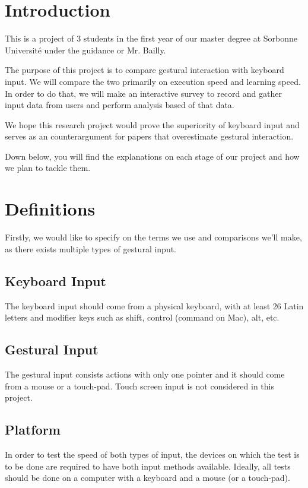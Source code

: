 \documentclass[12pt]{article}
\begin{document}
\section{Introduction}
This is a project of 3 students in the first year of our master degree at Sorbonne Université under the guidance or Mr. Bailly.

The purpose of this project is to compare gestural interaction with keyboard input. We will compare the two primarily on execution speed and learning speed. In order to do that, we will make an interactive survey to record and gather input data from users and perform analysis based of that data. 

We hope this research project would prove the superiority of keyboard input and serves as an counterargument for papers that overestimate gestural interaction.

Down below, you will find the explanations on each stage of our project and how we plan to tackle them.

\section{Definitions}
Firstly, we would like to specify on the terms we use and comparisons we'll make, as there exists multiple types of gestural input. 

\subsection{Keyboard Input}
The keyboard input should come from a physical keyboard, with at least 26 Latin letters and modifier keys such as shift, control (command on Mac), alt, etc.

\subsection{Gestural Input}
The gestural input consists actions with only one pointer and it should come from a mouse or a touch-pad. Touch screen input is not considered in this project.

\subsection{Platform}
In order to test the speed of both types of input, the devices on which the test is to be done are required to have both input methods available. Ideally, all tests should be done on a computer with a keyboard and a mouse (or a touch-pad).
\end{document}
